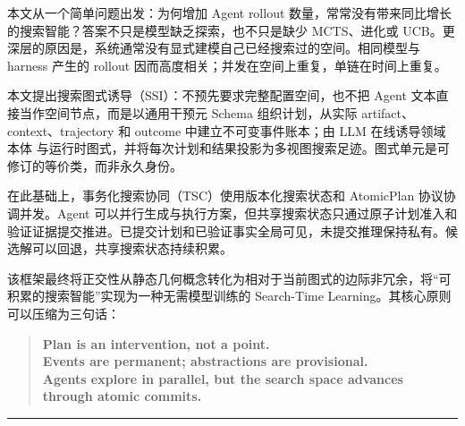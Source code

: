 \documentclass[
  11pt]{ctexart}
\begin{document}
本文从一个简单问题出发：为何增加 Agent rollout
数量，常常没有带来同比增长的搜索智能？答案不只是模型缺乏探索，也不只是缺少
MCTS、进化或
UCB。更深层的原因是，系统通常没有显式建模自己已经搜索过的空间。相同模型与
harness 产生的 rollout
因而高度相关；并发在空间上重复，单链在时间上重复。

本文提出搜索图式诱导（SSI）：不预先要求完整配置空间，也不把 Agent
文本直接当作空间节点，而是以通用干预元 Schema 组织计划，从实际
artifact、context、trajectory 和 outcome 中建立不可变事件账本；由 LLM
在线诱导领域本体
与运行时图式，并将每次计划和结果投影为多视图搜索足迹。图式单元是可修订的等价类，而非永久身份。

在此基础上，事务化搜索协同（TSC）使用版本化搜索状态和 AtomicPlan
协议协调并发。Agent
可以并行生成与执行方案，但共享搜索状态只通过原子计划准入和验证证据提交推进。已提交计划和已验证事实全局可见，未提交推理保持私有。候选解可以回退，共享搜索状态持续积累。

该框架最终将正交性从静态几何概念转化为相对于当前图式的边际非冗余，将``可积累的搜索智能''实现为一种无需模型训练的
Search-Time Learning。其核心原则可以压缩为三句话：

\begin{quote}
\textbf{Plan is an intervention, not a point.}\\
\textbf{Events are permanent; abstractions are provisional.}\\
\textbf{Agents explore in parallel, but the search space advances
through atomic commits.}
\end{quote}

\begin{center}\rule{0.5\linewidth}{0.5pt}\end{center}



\end{document}
